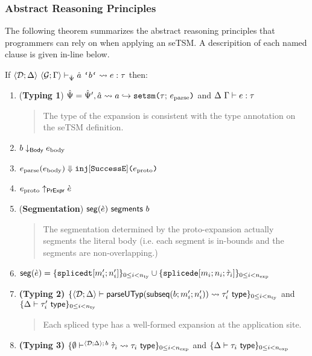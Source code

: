 

\subsubsection{Abstract Reasoning Principles}\label{sec:uetsms-reasoning-principles}
The following theorem summarizes the abstract reasoning principles that programmers can rely on when applying an seTSM. A descripition of each named clause is given in-line below. 

\begingroup
\def\thetheorem{\ref{thm:tsc-SES}}
\begin{theorem}
If $\expandsU{\uDD{\uD}{\Delta}}{\uGG{\uG}{\Gamma}}{\uPsi}{\utsmap{\tsmv}{b}}{e}{\tau}$ then:
\begin{enumerate}
\item (\textbf{Typing 1}) $\hat{\Psi} = \hat{\Psi}', \hat{a} \leadsto a \hookrightarrow \texttt{setsm}\texttt{(}\tau;\,e_\text{parse}\texttt{)}$ and $\Delta~\Gamma \vdash e : \tau$
  \begin{quote}
    The type of the expansion is consistent with the type annotation on the seTSM definition.
  \end{quote}
\item $b \downarrow_\mathsf{Body} e_\text{body}$
\item $e_\text{parse}(e_\text{body}) \Downarrow \texttt{inj}[\mathtt{SuccessE}]\texttt{(}e_\text{proto}\texttt{)}$
\item $e_\text{proto} \uparrow_\mathsf{PrExpr} \grave{e}$
\item (\textbf{Segmentation}) $\mathsf{seg}(\grave{e})~\mathsf{segments}~b$
  \begin{quote}
  The segmentation determined by the proto-expansion actually segments the literal body (i.e. each segment is in-bounds and the segments are non-overlapping.)
  \end{quote}
\item $\mathsf{seg}(\grave{e}) = \{\texttt{splicedt}[m'_i; n'_i]\}_{0 \leq i < n_\text{ty}} \cup \{\texttt{splicede}[m_i; n_i; \grave{\tau}_i]\}_{0 \leq i < n_\text{exp}}$
\item \textbf{(Typing 2)} $\{
      \langle \mathcal{D}; \Delta \rangle \vdash 
        \mathsf{parseUTyp}(\mathsf{subseq}(b; m'_i; n'_i))
       \leadsto \tau'_i~\mathsf{type}
    \}_{0 \leq i < n_\text{ty}}$ and $\{\Delta \vdash \tau'_i~\mathsf{type}\}_{0 \leq i < n_\text{ty}}$
    \begin{quote}
    Each spliced type has a well-formed expansion at the application site.
    \end{quote}
\item \textbf{(Typing 3)} $\{
  \emptyset\vdash^{
    \langle \mathcal{D}; \Delta \rangle
      ;\,b
  } 
    \grave{\tau}_i
   \leadsto \tau_i~\mathsf{type}
\}_{0 \leq i < n_\text{exp}}$ and $\{\Delta \vdash \tau_i~\mathsf{type}\}_{0 \leq i < n_\text{exp}}$

\end{enumerate}
\end{theorem}
